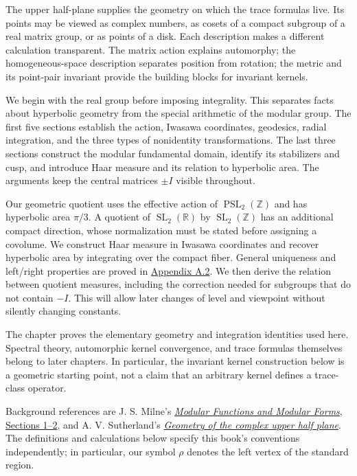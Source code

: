 The upper half-plane supplies the geometry on which the trace formulas live. Its points may be viewed as complex numbers, as cosets of a compact subgroup of a real matrix group, or as points of a disk. Each description makes a different calculation transparent. The matrix action explains automorphy; the homogeneous-space description separates position from rotation; the metric and its point-pair invariant provide the building blocks for invariant kernels.

We begin with the real group before imposing integrality. This separates facts about hyperbolic geometry from the special arithmetic of the modular group. The first five sections establish the action, Iwasawa coordinates, geodesics, radial integration, and the three types of nonidentity transformations. The last three sections construct the modular fundamental domain, identify its stabilizers and cusp, and introduce Haar measure and its relation to hyperbolic area. The arguments keep the central matrices $\pm I$ visible throughout.

Our geometric quotient uses the effective action of $\operatorname{PSL}_2(\mathbb Z)$ and has hyperbolic area $\pi/3$. A quotient of $\operatorname{SL}_2(\mathbb R)$ by $\operatorname{SL}_2(\mathbb Z)$ has an additional compact direction, whose normalization must be stated before assigning a covolume. We construct Haar measure in Iwasawa coordinates and recover hyperbolic area by integrating over the compact fiber. General uniqueness and left/right properties are proved in \hyperref[v1a-app-a-s2]{Appendix A.2}. We then derive the relation between quotient measures, including the correction needed for subgroups that do not contain $-I$. This will allow later changes of level and viewpoint without silently changing constants.

The chapter proves the elementary geometry and integration identities used here. Spectral theory, automorphic kernel convergence, and trace formulas themselves belong to later chapters. In particular, the invariant kernel construction below is a geometric starting point, not a claim that an arbitrary kernel defines a trace-class operator.

Background references are J. S. Milne's \href{https://www.jmilne.org/math/CourseNotes/MF.pdf}{\emph{Modular Functions and Modular Forms}, Sections 1--2}, and A. V. Sutherland's \href{https://math.mit.edu/classes/18.786/2024/LectureNotes1.pdf}{\emph{Geometry of the complex upper half plane}}. The definitions and calculations below specify this book's conventions independently; in particular, our symbol $\rho$ denotes the left vertex of the standard region.

